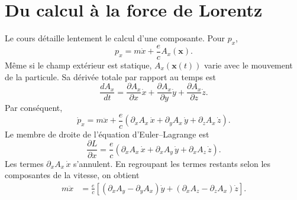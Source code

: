 \begin{classroomqa}
\end{classroomqa}

\section{Du calcul à la force de Lorentz}

Le cours détaille lentement le calcul d’une composante. Pour \(p_x\),
\begin{equation}
  p_x=m\dot x+\frac{e}{c}A_x(\mathbf x).
\end{equation}
Même si le champ extérieur est statique, \(A_x(\mathbf x(t))\) varie avec le mouvement de la particule. Sa dérivée totale par rapport au temps est
\begin{equation}
  \frac{dA_x}{dt}
  =
  \frac{\partial A_x}{\partial x}\dot x
  +
  \frac{\partial A_x}{\partial y}\dot y
  +
  \frac{\partial A_x}{\partial z}\dot z.
\end{equation}
Par conséquent,
\begin{equation}
  \dot p_x
  =
  m\ddot x
  +
  \frac{e}{c}
  \left(
    \partial_xA_x\,\dot x
    +
    \partial_yA_x\,\dot y
    +
    \partial_zA_x\,\dot z
  \right).
\end{equation}
Le membre de droite de l’équation d’Euler--Lagrange est
\begin{equation}
  \frac{\partial L}{\partial x}
  =
  \frac{e}{c}
  \left(
    \partial_xA_x\,\dot x
    +
    \partial_xA_y\,\dot y
    +
    \partial_xA_z\,\dot z
  \right).
\end{equation}
Les termes \(\partial_xA_x\,\dot x\) s’annulent. En regroupant les termes restants selon les composantes de la vitesse, on obtient
\begin{align}
  m\ddot x
  &=
  \frac{e}{c}
  \left[
    \left(\partial_xA_y-\partial_yA_x\right)\dot y
    +
    \left(\partial_xA_z-\partial_zA_x\right)\dot z
  \right].
\end{align}

